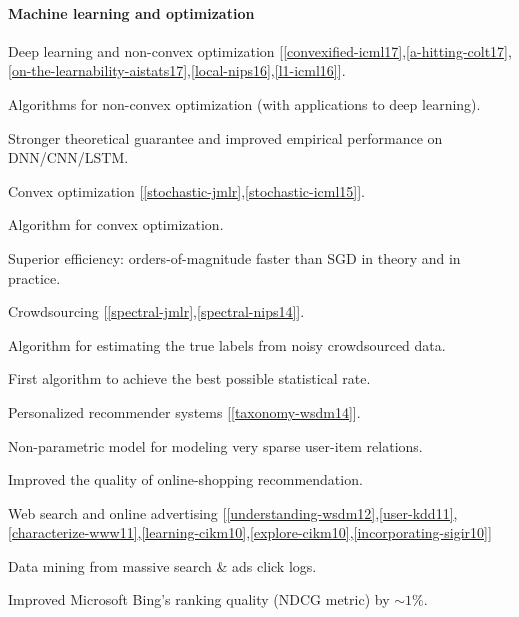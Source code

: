 \documentclass{res} %
\newenvironment{my_item}{
\begin{itemize}
  \setlength{\itemsep}{0pt}
  \setlength{\parskip}{0pt}
  \setlength{\parsep}{0pt}}
{\end{itemize}
}
\begin{document}
\begin{resume}
\paragraph{Machine learning and optimization}
\begin{my_item}
\item Deep learning and non-convex optimization [\ref{convexified-icml17},\ref{a-hitting-colt17},\ref{on-the-learnability-aistats17},\ref{local-nips16},\ref{l1-icml16}].
\begin{my_item}
\item Algorithms for non-convex optimization (with applications to deep learning).
\item Stronger theoretical guarantee and improved empirical performance on DNN/CNN/LSTM.
\end{my_item}
\item Convex optimization [\ref{stochastic-jmlr},\ref{stochastic-icml15}].
\begin{my_item}
\item Algorithm for convex optimization.
\item Superior efficiency: orders-of-magnitude faster than SGD in theory and in practice.
\end{my_item}
\item Crowdsourcing [\ref{spectral-jmlr},\ref{spectral-nips14}].
\begin{my_item}
\item Algorithm for estimating the true labels from noisy crowdsourced data.
\item First algorithm to achieve the best possible statistical rate.
\end{my_item}
\item Personalized recommender systems [\ref{taxonomy-wsdm14}].
\begin{my_item}
\item Non-parametric model for modeling very sparse user-item relations.
\item Improved the quality of online-shopping recommendation.
\end{my_item}
\item Web search and online advertising [\ref{understanding-wsdm12},\ref{user-kdd11},\ref{characterize-www11},\ref{learning-cikm10},\ref{explore-cikm10},\ref{incorporating-sigir10}]
\begin{my_item}
\item Data mining from massive search \& ads click logs.
\item Improved Microsoft Bing's ranking quality (NDCG metric) by $\sim1\%$. 
\end{my_item}
\end{my_item}


\end{resume}
\end{document}
